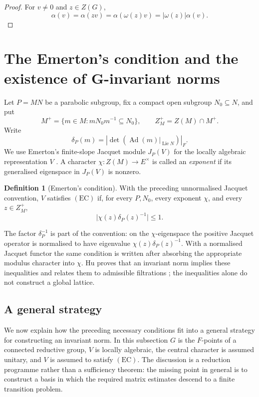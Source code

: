 \documentclass[12pt]{article}
\theoremstyle{definition}
\newtheorem{definition}[theorem]{Definition}
\theoremstyle{remark}
\begin{document}
\begin{proof}
For $v\neq0$ and $z\in Z(G)$,
\[
 \alpha(v)=\alpha(zv)=\alpha(\omega(z)v)
 =|\omega(z)|\alpha(v).
\]
\end{proof}



\section{The Emerton's condition and the existence of G-invariant norms}

Let $P=MN$ be a parabolic subgroup, fix a compact open subgroup
$N_0\subseteq N$, and put
\[
 M^+=\{m\in M:mN_0m^{-1}\subseteq N_0\},\qquad
 Z_M^+=Z(M)\cap M^+.
\]
Write
\[
 \delta_P(m)
  =\left|\det\!\left(\operatorname{Ad}(m)|_{\operatorname{Lie}N}
    \right)\right|_F.
\]
We use Emerton's finite-slope Jacquet module $J_P(V)$ for the locally
algebraic representation $V$ \cite{MR2181093}.  A character
$\chi:Z(M)\to E^\times$ is called an \emph{exponent} if its
generalised eigenspace in $J_P(V)$ is nonzero.

\begin{definition}[Emerton's condition]
\label{def:Emerton-condition}
With the preceding unnormalised Jacquet convention, $V$ satisfies
$(\mathrm{EC})$ if, for every $P,N_0$, every exponent $\chi$, and every
$z\in Z_M^+$,
\begin{equation}\label{eq:Emerton-condition}
 \bigl|\chi(z)\delta_P(z)^{-1}\bigr|\leq1.
\end{equation}
\end{definition}

The factor $\delta_P^{-1}$ is part of the convention: on the
$\chi$-eigenspace the positive Jacquet operator is normalised to have
eigenvalue $\chi(z)\delta_P(z)^{-1}$.  With a normalised Jacquet
functor the same condition is written after absorbing the appropriate
modulus character into $\chi$.  Hu proves that an invariant norm
implies these inequalities and relates them to admissible filtrations
\cite{MR2560407}; the inequalities alone do not construct a global
lattice.



\subsection{A general strategy}

We now explain how the preceding necessary conditions fit into a general
strategy for constructing an invariant norm.  In this subsection $G$ is the
$F$-points of a connected reductive group, $V$ is locally algebraic, the
central character is assumed unitary, and $V$ is assumed to satisfy
$(\mathrm{EC})$.  The discussion is a reduction programme rather than a
sufficiency theorem: the missing point in general is to construct a basis in
which the required matrix estimates descend to a finite transition problem.
\end{document}
